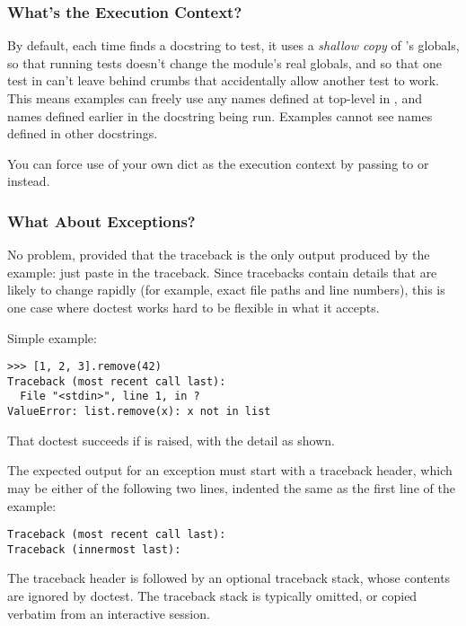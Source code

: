 \subsubsection{What's the Execution Context?\label{doctest-execution-context}}

By default, each time  finds a docstring to test, it
uses a \emph{shallow copy} of 's globals, so that running tests
doesn't change the module's real globals, and so that one test in
 can't leave behind crumbs that accidentally allow another test
to work.  This means examples can freely use any names defined at top-level
in , and names defined earlier in the docstring being run.
Examples cannot see names defined in other docstrings.

You can force use of your own dict as the execution context by passing
 to  or
 instead.

\subsubsection{What About Exceptions?\label{doctest-exceptions}}

No problem, provided that the traceback is the only output produced by
the example:  just paste in the traceback.  Since tracebacks contain
details that are likely to change rapidly (for example, exact file paths
and line numbers), this is one case where doctest works hard to be
flexible in what it accepts.

Simple example:

\begin{verbatim}
>>> [1, 2, 3].remove(42)
Traceback (most recent call last):
  File "<stdin>", line 1, in ?
ValueError: list.remove(x): x not in list
\end{verbatim}

That doctest succeeds if  is raised, with the
 detail as shown.

The expected output for an exception must start with a traceback
header, which may be either of the following two lines, indented the
same as the first line of the example:

\begin{verbatim}
Traceback (most recent call last):
Traceback (innermost last):
\end{verbatim}

The traceback header is followed by an optional traceback stack, whose
contents are ignored by doctest.  The traceback stack is typically
omitted, or copied verbatim from an interactive session.

